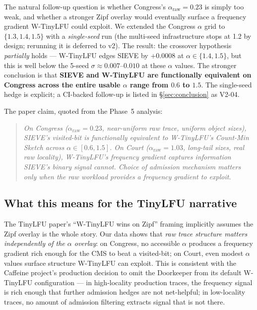 The natural follow-up question is whether Congress's $\alpha_{\text{raw}}=0.23$
is simply too weak, and whether a stronger Zipf overlay would eventually
surface a frequency gradient W-TinyLFU could exploit. We extended the Congress
$\alpha$ grid to $\{1.3, 1.4, 1.5\}$ with a \emph{single-seed} run (the
multi-seed infrastructure stops at 1.2 by design; rerunning it is deferred to
v2). The result: the crossover hypothesis \emph{partially} holds ---
W-TinyLFU edges SIEVE by $+0.0008$ at $\alpha \in \{1.4, 1.5\}$, but this is
well below the 5-seed $\sigma \approx 0.007$--$0.010$ at these $\alpha$ values.
The stronger conclusion is that \textbf{SIEVE and W-TinyLFU are functionally
equivalent on Congress across the entire usable $\alpha$ range from $0.6$ to
$1.5$}. The single-seed hedge is explicit; a CI-backed follow-up is listed in
\S\ref{sec:conclusion} as V2-04.

The paper claim, quoted from the Phase~5 analysis:

\begin{quote}\itshape\small
On Congress ($\alpha_{\text{raw}}=0.23$, near-uniform raw trace, uniform object
sizes), SIEVE's visited-bit is functionally equivalent to W-TinyLFU's
Count-Min Sketch across $\alpha \in [0.6, 1.5]$. On Court
($\alpha_{\text{raw}}=1.03$, long-tail sizes, real raw locality), W-TinyLFU's
frequency gradient captures information SIEVE's binary signal cannot. Choice
of admission mechanism matters \emph{only} when the raw workload provides a
frequency gradient to exploit.
\end{quote}

\subsection{What this means for the TinyLFU narrative}

The TinyLFU paper's ``W-TinyLFU wins on Zipf'' framing \cite{einziger2017tinylfu}
implicitly assumes the Zipf overlay is the whole story. Our data shows that
\emph{raw trace structure matters independently of the $\alpha$ overlay}: on
Congress, no accessible $\alpha$ produces a frequency gradient rich enough for
the CMS to beat a visited-bit; on Court, even modest $\alpha$ values surface
structure W-TinyLFU can exploit. This is consistent with the Caffeine
project's production decision to omit the Doorkeeper from its default
W-TinyLFU configuration \cite{caffeine2024} --- in high-locality production
traces, the frequency signal is rich enough that further admission hedges are
not net-helpful; in low-locality traces, no amount of admission filtering
extracts signal that is not there.

